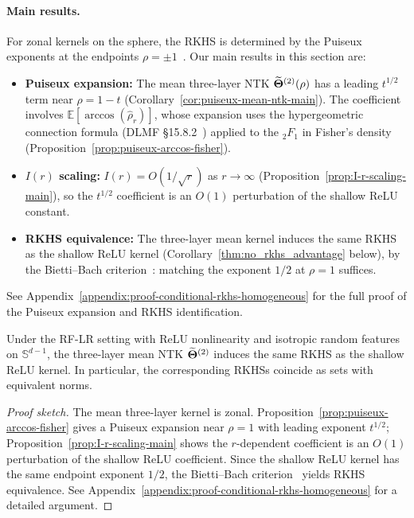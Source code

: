 \paragraph{Main results.}
For zonal kernels on the sphere, the RKHS is determined by the Puiseux exponents at the endpoints \(\rho=\pm 1\)~\cite{bietti2021deepequalsshallowrelu}. Our main results in this section are:
\begin{itemize}
    \item \textbf{Puiseux expansion:} The mean three-layer NTK \(\widetilde{\boldsymbol{\Theta}}^{(2)}(\rho)\) has a leading \(t^{1/2}\) term near \(\rho=1-t\) (Corollary~\ref{cor:puiseux-mean-ntk-main}). The coefficient involves \(\mathbb{E}[\arccos(\hat{\rho}_r)]\), whose expansion uses the hypergeometric connection formula (DLMF §15.8.2~\cite{nist_dlmf}) applied to the \({}_2F_1\) in Fisher's density (Proposition~\ref{prop:puiseux-arccos-fisher}).
    \item \textbf{\(I(r)\) scaling:} \(I(r)=O(1/\sqrt{r})\) as \(r\to\infty\) (Proposition~\ref{prop:I-r-scaling-main}), so the \(t^{1/2}\) coefficient is an \(O(1)\) perturbation of the shallow ReLU constant.
    \item \textbf{RKHS equivalence:} The three-layer mean kernel induces the same RKHS as the shallow ReLU kernel (Corollary~\ref{thm:no_rkhs_advantage} below), by the Bietti--Bach criterion~\cite[Theorem~1]{bietti2021deepequalsshallowrelu}: matching the exponent \(1/2\) at \(\rho=1\) suffices.
\end{itemize}
See Appendix~\ref{appendix:proof-conditional-rkhs-homogeneous} for the full proof of the Puiseux expansion and RKHS identification.

\begin{corollary}\label{thm:no_rkhs_advantage}
Under the RF-LR setting with ReLU nonlinearity and isotropic random features on \(\mathbb{S}^{d-1}\), the three-layer mean NTK \(\widetilde{\boldsymbol{\Theta}}^{(2)}\) induces the same RKHS as the shallow ReLU kernel. In particular, the corresponding RKHSs coincide as sets with equivalent norms.
\end{corollary}
\begin{proof}[Proof sketch]
The mean three-layer kernel is zonal. Proposition~\ref{prop:puiseux-arccos-fisher} gives a Puiseux expansion near \(\rho=1\) with leading exponent \(t^{1/2}\); Proposition~\ref{prop:I-r-scaling-main} shows the \(r\)-dependent coefficient is an \(O(1)\) perturbation of the shallow ReLU coefficient. Since the shallow ReLU kernel has the same endpoint exponent \(1/2\), the Bietti--Bach criterion~\cite{bietti2021deepequalsshallowrelu} yields RKHS equivalence. See Appendix~\ref{appendix:proof-conditional-rkhs-homogeneous} for a detailed argument.
\end{proof}
